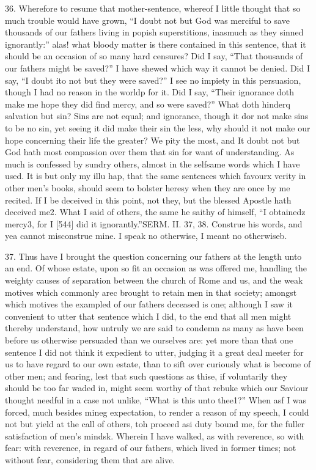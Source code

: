 36. Wherefore to resume that mother-sentence, whereof I little thought that so much trouble would have grown, “I doubt not but God was merciful to save thousands of our fathers living in popish superstitions, inasmuch as they sinned ignorantly:” alas! what bloody matter is there contained in this sentence, that it should be an occasion of so many hard censures? Did I say, “That thousands of our fathers might be saved?” I have shewed which way it cannot be denied. Did I say, “I doubt ito not but they were saved?” I see no impiety in this persuasion, though I had no reason in the worldp for it. Did I say, “Their ignorance doth make me hope they did find mercy, and so were saved?” What doth hinderq salvation but sin? Sins are not equal; and ignorance, though it dor not make sins to be no sin, yet seeing it did make their sin the less, why should it not make our hope concerning their life the greater? We pity the most, and It doubt not but God hath most compassion over them that sin for want of understanding. As much is confessed by sundry others, almost in the selfsame words which I have used. It is but only my illu hap, that the same sentences which favourx verity in other men’s books, should seem to bolster heresy when they are once by me recited. If I be deceived in this point, not they, but the blessed Apostle hath deceived me2. What I said of others, the same he saithy of himself, “I obtainedz mercy3, for I [544] did it ignorantly.”SERM. II. 37, 38. Construe his words, and yea cannot misconstrue mine. I speak no otherwise, I meant no otherwiseb.

37. Thus have I brought the question concerning our fathers at the length unto an end. Of whose estate, upon so fit an occasion as was offered me, handling the weighty causes of separation between the church of Rome and us, and the weak motives which commonly arec brought to retain men in that society; amongst which motives the exampled of our fathers deceased is one; although I saw it convenient to utter that sentence which I did, to the end that all men might thereby understand, how untruly we are said to condemn as many as have been before us otherwise persuaded than we ourselves are: yet more than that one sentence I did not think it expedient to utter, judging it a great deal meeter for us to have regard to our own estate, than to sift over curiously what is become of other men; and fearing, lest that such questions as thise, if voluntarily they should be too far waded in, might seem worthy of that rebuke which our Saviour thought needful in a case not unlike, “What is this unto thee1?” When asf I was forced, much besides mineg expectation, to render a reason of my speech, I could not but yield at the call of others, toh proceed asi duty bound me, for the fuller satisfaction of men’s mindsk. Wherein I have walked, as with reverence, so with fear: with reverence, in regard of our fathers, which lived in former times; not without fear, considering them that are alive.

